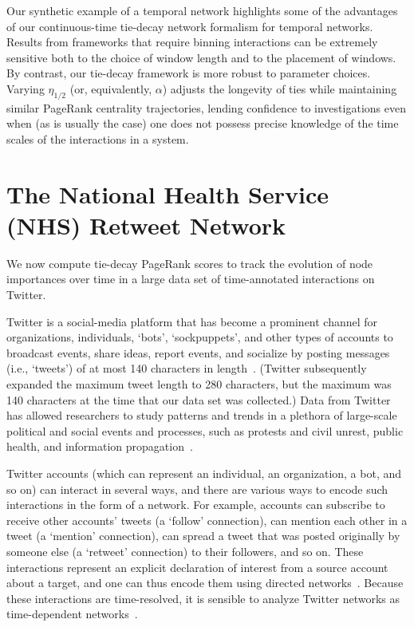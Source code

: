 \documentclass[journal,transmag]{IEEEtran}
\begin{document}
Our synthetic example of a temporal network highlights some of the
advantages of our continuous-time tie-decay network formalism for
temporal networks. Results from frameworks that require binning
interactions can be extremely sensitive both to the choice of window
length and to the placement of windows. By contrast, our tie-decay
framework is more robust to parameter choices. Varying $\eta_{1/2}$
(or, equivalently, $\alpha$) adjusts the longevity of ties while
maintaining similar PageRank centrality trajectories, lending
confidence to investigations even when (as is usually the case) one
does not possess precise knowledge of the time scales of the
interactions in a system.



\section{The National Health Service (NHS) Retweet Network}\label{nhs}
%
We now compute tie-decay 
PageRank scores to track the
evolution of node importances over time in a large data set of
time-annotated interactions on Twitter.

Twitter is a social-media platform that has become a prominent channel
for organizations, individuals, `bots', `sockpuppets', and other types of accounts to broadcast events, share
ideas, report events, and socialize by posting messages (i.e.,
`tweets') of at most 140 characters in
length~\cite{Kwak2010}. (Twitter subsequently expanded the maximum tweet
length to 280 characters, but the maximum was 140 characters at the
time that our data set was collected.) Data from Twitter has allowed
researchers to study patterns and trends 
in a plethora of large-scale political and social events and processes, such as
protests and civil unrest, public health, and information
propagation~\cite{Beguerisse2014, Beguerisse2017, Cihon2016,Giles2012,
  gonzalez2016networked, morales2012users, OSullivan2017,
  tonkin2012twitter}.

Twitter accounts (which can represent an individual, an organization,
a bot, and so on) can interact in several ways, and there are various
ways to encode such interactions in the form of a network. For
example, accounts can subscribe to receive other accounts' tweets (a
`follow' connection), can mention each other in a tweet (a `mention'
connection), can spread a tweet that was posted originally by someone else (a
`retweet' connection) to their followers, and so on. These
interactions represent an explicit declaration of interest from a
source account about a target, and one can thus encode them using
directed networks~\cite{Beguerisse2014}. Because these interactions are 
time-resolved, it is sensible to analyze Twitter networks as time-dependent
networks~\cite{Beguerisse2017}.
\end{document}
